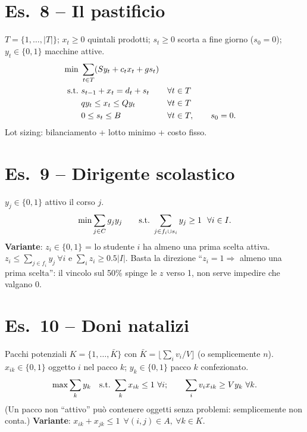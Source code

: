 \section*{Es.\ 8 -- Il pastificio}
$T=\{1,\dots,|T|\}$; $x_t\ge0$ quintali prodotti; $s_t\ge0$ scorta a fine giorno ($s_0=0$); $y_t\in\{0,1\}$ macchine attive.
\begin{align*}
\min\ & \sum_{t\in T}(Sy_t+c_tx_t+gs_t)\\
\text{s.t.}\ & s_{t-1}+x_t=d_t+s_t && \forall t\in T\\
& qy_t\le x_t\le Qy_t && \forall t\in T\\
& 0\le s_t\le B && \forall t\in T,\qquad s_0=0.
\end{align*}
Lot sizing: bilanciamento + lotto minimo + costo fisso.

\section*{Es.\ 9 -- Dirigente scolastico}
$y_j\in\{0,1\}$ attivo il corso $j$.
\[ \min\sum_{j\in C}g_jy_j\qquad\st\ \sum_{j\in f_i\cup s_i}y_j\ge1\ \ \forall i\in I. \]
\textbf{Variante}: $z_i\in\{0,1\}$ = lo studente $i$ ha almeno una prima scelta attiva. $z_i\le\sum_{j\in f_i}y_j\ \forall i$ e $\sum_iz_i\ge0.5|I|$. Basta la direzione ``$z_i=1\Rightarrow$ almeno una prima scelta'': il vincolo sul 50\% spinge le $z$ verso 1, non serve impedire che valgano 0.

\section*{Es.\ 10 -- Doni natalizi}
Pacchi potenziali $K=\{1,\dots,\bar K\}$ con $\bar K=\lfloor\sum_iv_i/V\rfloor$ (o semplicemente $n$). $x_{ik}\in\{0,1\}$ oggetto $i$ nel pacco $k$; $y_k\in\{0,1\}$ pacco $k$ confezionato.
\[ \max\sum_ky_k\quad\st\ \sum_kx_{ik}\le1\ \forall i;\qquad \sum_iv_ix_{ik}\ge Vy_k\ \forall k. \]
(Un pacco non ``attivo'' può contenere oggetti senza problemi: semplicemente non conta.)
\textbf{Variante}: $x_{ik}+x_{jk}\le1\ \ \forall(i,j)\in A,\ \forall k\in K$.

